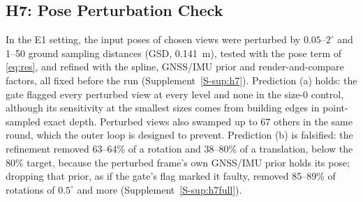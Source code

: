 \subsection{H7: Pose Perturbation Check}
\label{sec:results:h7}
In the E1 setting, the input poses of chosen views were perturbed by $0.05$--$2^{\circ}$ and 1--50 ground
sampling distances (GSD, 0.141~m), tested with the pose term of \eqref{eq:res}, and refined with the
spline, GNSS/IMU prior and render-and-compare factors, all fixed before the run (Supplement~\ref{S-sup:h7}).
Prediction (a) holds: the gate flagged every perturbed view at every level and none in the size-0 control,
although its sensitivity at the smallest sizes comes from building edges in point-sampled exact depth.
Perturbed views also swamped up to 67 others in the same round, which the outer loop is designed to
prevent. Prediction (b) is falsified: the refinement removed 63--64\% of a rotation and 38--80\% of a
translation, below the 80\% target, because the perturbed frame's own GNSS/IMU prior holds its pose;
dropping that prior, as if the gate's flag marked it faulty, removed 85--89\% of rotations of $0.5^{\circ}$
and more (Supplement~\ref{S-sup:h7full}).
